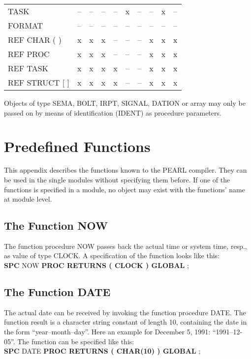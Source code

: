 \begin{table}[htb]
\begin{tabular}{lccccccccc}
TASK           & --    &  --     & --    &  --    &  x    &   --   &  -- &    x   &  --  \\
FORMAT         & --    &  --     & --    &  --    &  --   &   --   &  -- &    --  &  --  \\
REF CHAR ( )   & x     &  x      & x     &  --    &  --   &   --   &  x  &    x   &  x   \\
REF PROC       & x     &  x      & x     &  --    &  --   &   --   &  x  &    x   &  x   \\
REF TASK       & x     &  x      & x     &  x     &  --   &   --   &  x  &    x   &  x   \\
REF STRUCT [ ] & x     &  x      & x     &  x     &  --   &   --   &  x  &    x   &  x   \\
\end{tabular}
\end{table}
                                                                                 
Objects of type SEMA, BOLT, IRPT, SIGNAL, DATION or array may only be 
passed on by means of identification (IDENT) as procedure parameters.

\newpage
\section{Predefined Functions}   %

This appendix describes the functions known to the PEARL compiler. They
can be used in the single modules without specifying them before. If one
of the functions is specified in a module, no object may exist with the
functions' name at module level.

\begin{tobedone}
\subsection{The Function NOW}    %

The function procedure NOW passes back the actual time or system time, resp., 
as value of type CLOCK. A specification of the function looks like this:\\

{\bf SPC} NOW {\bf PROC RETURNS ( CLOCK ) GLOBAL} ; 


\subsection{The Function DATE}    %

The actual date can be received by invoking the function procedure DATE.
The function result is a character string constant of length 10, containing
the date in the form ``year--month--day''. Here an example for December 5,
1991: ``1991--12-05''. The function can be specified like this:\\

{\bf SPC} DATE {\bf PROC RETURNS ( CHAR(10) ) GLOBAL} ;
\end{tobedone}

